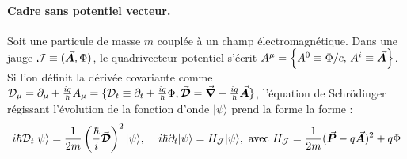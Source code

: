 %
%
%

\paragraph{Cadre sans potentiel vecteur.}

Soit une particule de masse $m$ couplée à un champ électromagnétique. Dans une jauge $\mathcal{J} \equiv (\vec{{\bm{A}}}, \Phi)$, le quadrivecteur potentiel s’écrit $A^\mu = \left\{ A^0 \equiv \Phi/c,\, A^i \equiv \vec{{\bm{A}}} \right\}$. Si l’on définit la dérivée covariante comme $\mathcal{D}_\mu = \partial_\mu + \frac{iq}{\hbar} A_\mu = \{ \mathcal{D}_t \equiv \partial_t + \frac{iq}{\hbar} \Phi , \vec{{\bm{\mathcal{D}}}} = \vec{{\bm{\nabla}}} - \frac{iq}{\hbar} \vec{{\bm{A}}}  \} $, l’équation de Schrödinger régissant l’évolution de la fonction d’onde $\vert \psi \rangle$  prend la forme la forme :
\begin{eqnarray}
	i\hbar \mathcal{D}_t \vert \psi \rangle = \frac{1}{2m} \left( \frac{\hbar}{i} \vec{{\bm{\mathcal{D}}}} \right)^2 \vert \psi \rangle, \, \quad   i\hbar \partial_t \vert \psi \rangle = H_{\mathcal{J}} \vert \psi \rangle , ~\mbox{avec}~	H_{\mathcal{J}} = \frac{1}{2m} (\vec{{\bm{P}}} - q \vec{{\bm{A}}})^2 + q\Phi
\end{eqnarray}


